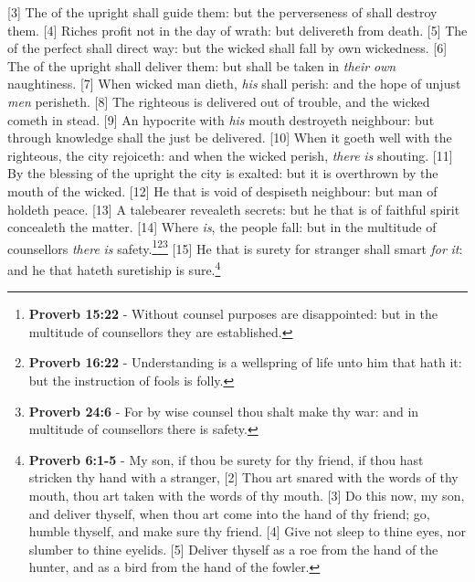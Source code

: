 [3] \textcolor[cmyk]{0.99998,1,0,0}{The  of the upright shall guide them: but the perverseness of  shall destroy them.}
[4] \textcolor[cmyk]{0.99998,1,0,0}{Riches profit not in the day of wrath: but  delivereth from death.}
[5] \textcolor[cmyk]{0.99998,1,0,0}{The  of the perfect shall direct  way: but the wicked shall fall by  own wickedness.}
[6] \textcolor[cmyk]{0.99998,1,0,0}{The  of the upright shall deliver them: but  shall be taken in \emph{their} \emph{own} naughtiness.}
[7] \textcolor[cmyk]{0.99998,1,0,0}{When  wicked man dieth, \emph{his}  shall perish: and the hope of unjust \emph{men} perisheth.}
[8] \textcolor[cmyk]{0.99998,1,0,0}{The righteous is delivered out of trouble, and the wicked cometh in  stead.}
[9] \textcolor[cmyk]{0.99998,1,0,0}{An hypocrite with \emph{his} mouth destroyeth  neighbour: but through knowledge shall the just be delivered.}
[10] \textcolor[cmyk]{0.99998,1,0,0}{When it goeth well with the righteous, the city rejoiceth: and when the wicked perish, \emph{there} \emph{is} shouting.}
[11] \textcolor[cmyk]{0.99998,1,0,0}{By the blessing of the upright the city is exalted: but it is overthrown by the mouth of the wicked.}
[12] \textcolor[cmyk]{0.99998,1,0,0}{He that is void of  despiseth  neighbour: but  man of  holdeth  peace.}
[13] \textcolor[cmyk]{0.99998,1,0,0}{A talebearer revealeth secrets: but he that is of  faithful spirit concealeth the matter.}
[14] \textcolor[cmyk]{0.99998,1,0,0}{Where  \emph{is}, the people fall: but in the multitude of counsellors \emph{there} \emph{is} safety.}\footnote{\textbf{Proverb 15:22} - Without counsel purposes are disappointed: but in the multitude of counsellors they are established.}\footnote{\textbf{Proverb 16:22} - Understanding is a wellspring of life unto him that hath it: but the instruction of fools is folly.}\footnote{\textbf{Proverb 24:6} - For by wise counsel thou shalt make thy war: and in multitude of counsellors there is safety.}
[15] \textcolor[cmyk]{0.99998,1,0,0}{He that is surety for  stranger shall smart \emph{for} \emph{it}: and he that hateth suretiship is sure.}\footnote{\textbf{Proverb 6:1-5} - My son, if thou be surety for thy friend, if thou hast stricken thy hand with a stranger, [2] Thou art snared with the words of thy mouth, thou art taken with the words of thy mouth. [3] Do this now, my son, and deliver thyself, when thou art come into the hand of thy friend; go, humble thyself, and make sure thy friend. [4] Give not sleep to thine eyes, nor slumber to thine eyelids. [5] Deliver thyself as a roe from the hand of the hunter, and as a bird from the hand of the fowler.}
